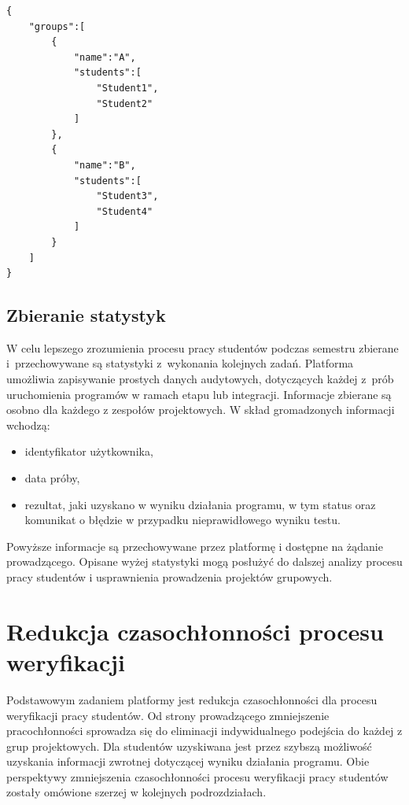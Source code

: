 {\selectfont
\scriptsize
\begin{lstlisting}
{
    "groups":[
        {
            "name":"A",
            "students":[
                "Student1",
                "Student2"
            ]
        },
        {
            "name":"B",
            "students":[
                "Student3",
                "Student4"
            ]
        }
    ]
}
\end{lstlisting}
}

\subsection{Zbieranie statystyk}

W celu lepszego zrozumienia procesu pracy studentów podczas semestru zbierane i~przechowywane są statystyki z~wykonania kolejnych zadań.
Platforma umożliwia zapisywanie prostych danych audytowych, dotyczących każdej z~prób uruchomienia programów w ramach etapu lub integracji.
Informacje zbierane są osobno dla każdego z zespołów projektowych.
W skład gromadzonych informacji wchodzą:
\begin{itemize}
    \item identyfikator użytkownika,
    \item data próby,
    \item rezultat, jaki uzyskano w wyniku działania programu, w tym status oraz komunikat o błędzie w przypadku nieprawidłowego wyniku testu.
\end{itemize}
Powyższe informacje są przechowywane przez platformę i dostępne na żądanie prowadzącego.
Opisane wyżej statystyki mogą posłużyć do dalszej analizy procesu pracy studentów i usprawnienia prowadzenia projektów grupowych.


\section{Redukcja czasochłonności procesu weryfikacji}

Podstawowym zadaniem platformy jest redukcja czasochłonności dla procesu weryfikacji pracy studentów.
Od strony prowadzącego zmniejszenie pracochłonności sprowadza się do eliminacji indywidualnego podejścia do każdej z grup projektowych.
Dla studentów uzyskiwana jest przez szybszą możliwość uzyskania informacji zwrotnej dotyczącej wyniku działania programu.
Obie perspektywy zmniejszenia czasochłonności procesu weryfikacji pracy studentów zostały omówione szerzej w kolejnych podrozdziałach.


